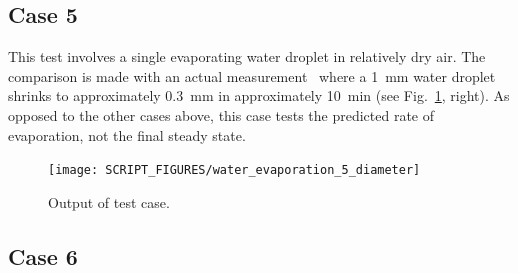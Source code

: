 \documentclass[11pt]{book}
\begin{document}
\subsection{Case 5}
\label{water_evaporation_5}

This test involves a single evaporating water droplet in relatively dry air. The comparison is made with an actual measurement~\cite{Ranz} where a 1~mm water droplet
shrinks to approximately 0.3~mm in approximately 10~min (see Fig.~\ref{water_evaporation_5_plot}, right).
As opposed to the other cases above, this case tests the predicted rate of evaporation, not the final steady state.

\begin{figure}[h!]
\centering
\texttt{[image: SCRIPT\_FIGURES/water\_evaporation\_5\_diameter]}
\caption[Sample case ]{Output of  test case.}
\label{water_evaporation_5_plot}
\end{figure}

\subsection{Case 6}
\label{water_evaporation_6}
\end{document}
